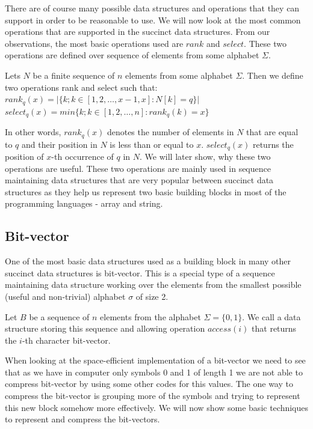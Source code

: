 There are of course many possible data structures and operations that they can support in order to be reasonable to use. We will now look at the most common operations that are supported in the succinct data structures. From our observations, the most basic operations used are $rank$ and $select$. These two operations are defined over sequence of elements from some alphabet $\Sigma$.

\begin{theorem}
Lets $N$ be a finite sequence of $n$ elements from some alphabet $\Sigma$.
Then we define two operations rank and select such that: \\
$rank_q(x) = | \{k; k \in [ 1, 2, \ldots, x-1, x] : N[k] = q  \} |$ \\
$select_q(x) = min \{k; k \in [ 1, 2, \ldots, n] : rank_q(k)=x  \} $
\end{theorem}

In other words, $rank_q(x)$ denotes the number of elements in $N$ that are equal to $q$ and their position in $N$ is less than or equal to $x$. $select_q(x)$ returns the position of $x$-th occurrence of $q$ in $N$. We will later show, why these two operations are useful. These two operations are mainly used in sequence maintaining data structures that are very popular between succinct data structures as they help us represent two basic building blocks in most of the programming languages - array and string.

\subsection{Bit-vector}

One of the most basic data structures used as a building block in many other succinct data structures is bit-vector. This is a special type of a sequence maintaining data structure working over the elements from the smallest possible (useful and non-trivial) alphabet $\sigma$ of size 2.

\begin{theorem}
Let $B$ be a sequence of $n$ elements from the alphabet $\Sigma = \{0, 1\}$. We call a data structure storing this sequence
and allowing operation $access(i)$ that returns the $i$-th character bit-vector.
\end{theorem}

When looking at the space-efficient implementation of a bit-vector we need to see that as we have in computer only symbols 0 and 1 of length 1 we are not able to compress bit-vector by using some other codes for this values. The one way to compress the bit-vector is grouping more of the symbols and trying to represent this new block somehow more effectively. We will now show some basic techniques to represent and compress the bit-vectors. 

